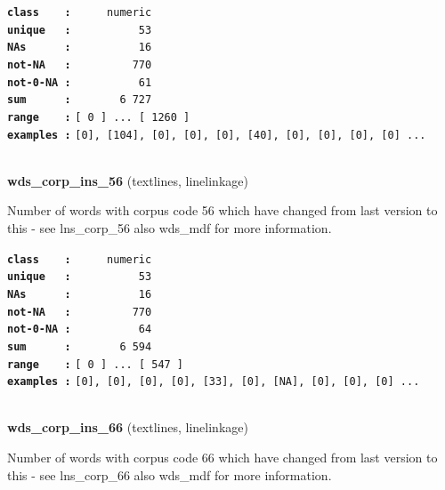 \documentclass[]{article}
\begin{document}
\textbf{\texttt{class\ \ \ \ :}} \texttt{~~~~~numeric}\\
\textbf{\texttt{unique\ \ \ :}} \texttt{~~~~~~~~~~53}\\
\textbf{\texttt{NAs\ \ \ \ \ \ :}} \texttt{~~~~~~~~~~16}\\
\textbf{\texttt{not-NA\ \ \ :}} \texttt{~~~~~~~~~770}\\
\textbf{\texttt{not-0-NA\ :}} \texttt{~~~~~~~~~~61}\\
\textbf{\texttt{sum\ \ \ \ \ \ :}} \texttt{~~~~~~~6~727}\\
\textbf{\texttt{range\ \ \ \ :}}
\texttt{{[}\ 0\ {]}\ ...\ {[}\ 1260\ {]}}\\
\textbf{\texttt{examples\ :}}
\texttt{{[}0{]},\ {[}104{]},\ {[}0{]},\ {[}0{]},\ {[}0{]},\ {[}40{]},\ {[}0{]},\ {[}0{]},\ {[}0{]},\ {[}0{]}\ ...}\\

~

\textbf{wds\_corp\_ins\_56} (textlines, linelinkage)

Number of words with corpus code 56 which have changed from last version
to this - see lns\_corp\_56 also wds\_mdf for more information.

\textbf{\texttt{class\ \ \ \ :}} \texttt{~~~~~numeric}\\
\textbf{\texttt{unique\ \ \ :}} \texttt{~~~~~~~~~~53}\\
\textbf{\texttt{NAs\ \ \ \ \ \ :}} \texttt{~~~~~~~~~~16}\\
\textbf{\texttt{not-NA\ \ \ :}} \texttt{~~~~~~~~~770}\\
\textbf{\texttt{not-0-NA\ :}} \texttt{~~~~~~~~~~64}\\
\textbf{\texttt{sum\ \ \ \ \ \ :}} \texttt{~~~~~~~6~594}\\
\textbf{\texttt{range\ \ \ \ :}}
\texttt{{[}\ 0\ {]}\ ...\ {[}\ 547\ {]}}\\
\textbf{\texttt{examples\ :}}
\texttt{{[}0{]},\ {[}0{]},\ {[}0{]},\ {[}0{]},\ {[}33{]},\ {[}0{]},\ {[}NA{]},\ {[}0{]},\ {[}0{]},\ {[}0{]}\ ...}\\

~

\textbf{wds\_corp\_ins\_66} (textlines, linelinkage)

Number of words with corpus code 66 which have changed from last version
to this - see lns\_corp\_66 also wds\_mdf for more information.
\end{document}
